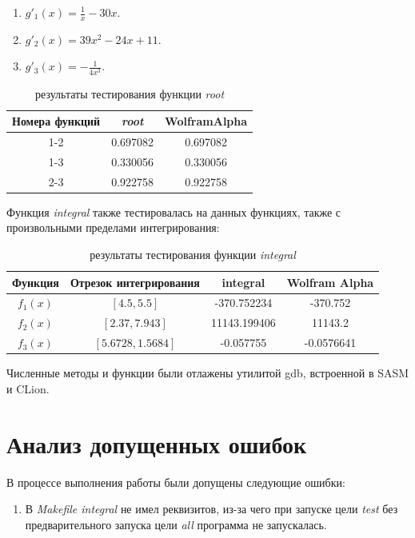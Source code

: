 \documentclass[a4paper,12pt,titlepage,finall]{article}
\begin{document}
\begin{enumerate}
\item {$g'_1(x) = \frac{1}{x} - 30x$}.
\item {$g'_2(x) = 39x^2 - 24x + 11$}.
\item {$g'_3(x) = -\frac{1}{4x^3}$}.
\end{enumerate}\par

\begin{table}[h]
\centering
\begin{tabular}{|c|c|c|}
\hline
Номера функций & \textit{root} & WolframAlpha \\
\hline
    1-2 & 0.697082 & 0.697082 \\
    1-3 & 0.330056 & 0.330056 \\
    2-3 & 0.922758 & 0.922758 \\
\hline
\end{tabular}
\caption{результаты тестирования функции \textit{root}}
\label{table2}
\end{table}

Функция \textit{integral} также тестировалась на данных функциях, также с произвольными пределами интегрирования: \par
\begin{table}[h]
\centering
\begin{tabular}{|c|c|c|c|}
\hline
Функция & Отрезок интегрирования & integral & Wolfram Alpha \\
\hline
{$f_1(x)$} & {$[4.5, 5.5]$} & -370.752234 & -370.752 \\
{$f_2(x)$} & {$[2.37, 7.943]$} & 11143.199406 & 11143.2 \\
{$f_3(x)$} & {$[5.6728, 1.5684]$} & -0.057755 & -0.0576641 \\

\hline
\end{tabular}
\caption{результаты тестирования функции \textit{integral}}
\label{table1}
\end{table}

Численные методы и функции были отлажены утилитой gdb, встроенной в SASM и CLion.

\newpage

\section{Анализ допущенных ошибок}
В процессе выполнения работы были допущены следующие ошибки:
\begin{enumerate}
\item {В \textit{Makefile integral} не имел реквизитов, из-за чего при запуске цели \textit{test} без предварительного запуска цели \textit{all} программа не запускалась}.

\end{enumerate}
\end{document}
